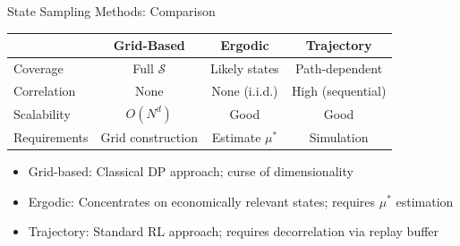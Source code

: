 \documentclass[aspectratio=169]{beamer}
\newcommand{\1}{\mathbf{1}}
\begin{document}
\begin{frame}{State Sampling Methods: Comparison}
  \small
  \begin{center}
  \begin{tabular}{lccc}
  \toprule
  & Grid-Based & Ergodic & Trajectory \\
  \midrule
  Coverage & Full $\mathcal{S}$ & Likely states & Path-dependent \\
  Correlation & None & None (i.i.d.) & High (sequential) \\
  Scalability & $O(N^d)$ & Good & Good \\
  Requirements & Grid construction & Estimate $\mu^*$ & Simulation \\
  \bottomrule
  \end{tabular}
  \end{center}
  \vspace{0.5em}
  \begin{itemize}
      \item Grid-based: Classical DP approach; curse of dimensionality
      \item Ergodic: Concentrates on economically relevant states; requires $\mu^*$ estimation
      \item Trajectory: Standard RL approach; requires decorrelation via replay buffer
  \end{itemize}
\end{frame}
\end{document}
